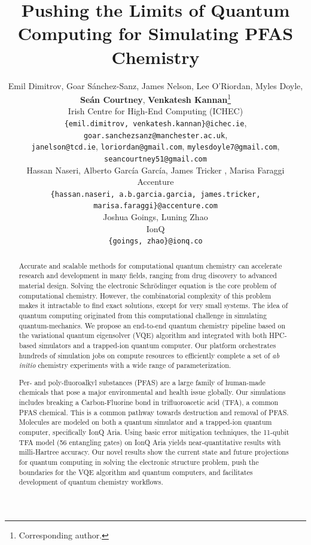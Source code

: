\documentclass[journal,onecolumn]{IEEEtran}
\title{
Pushing the Limits of Quantum Computing for Simulating PFAS Chemistry
}
\author{
    Emil Dimitrov, Goar S{\'a}nchez-Sanz, James Nelson, Lee O'Riordan, Myles Doyle, \\
    \textbf{Se{\'a}n Courtney}, \textbf{Venkatesh Kannan}{\thanks{Corresponding author.}} \\
    Irish Centre for High-End Computing (ICHEC) \\
    \texttt{\{emil.dimitrov, venkatesh.kannan\}@ichec.ie}, \texttt{goar.sanchezsanz@manchester.ac.uk}, \\
    \texttt{janelson@tcd.ie}, \texttt{loriordan@gmail.com}, \texttt{mylesdoyle7@gmail.com}, \texttt{seancourtney51@gmail.com} \\
  \And
    Hassan Naseri, Alberto Garc{\'i}a Garc{\'i}a, James Tricker , Marisa Faraggi\\
    Accenture \\
    \texttt{\{hassan.naseri, a.b.garcia.garcia, james.tricker, marisa.faraggi\}@accenture.com} \\
  \And
    Joshua Goings, Luning Zhao \\
    IonQ \\
    \texttt{\{goings, zhao\}@ionq.co}
}
\begin{document}
\maketitle

\begin{abstract}
Accurate and scalable methods for computational quantum chemistry can accelerate research and development in many fields, ranging from drug discovery to advanced material design. 
%
Solving the electronic Schr\"odinger equation is the core problem of computational chemistry. 
%
However, the combinatorial complexity of this problem makes it  intractable to find exact solutions, except for very small systems. 
%
The idea of quantum computing originated from this computational challenge in simulating quantum-mechanics. 
%
We propose an end-to-end quantum chemistry pipeline based on the variational quantum eigensolver (VQE) algorithm and integrated with both HPC-based simulators and a trapped-ion quantum computer. 
%
 Our platform orchestrates hundreds of simulation jobs on compute resources to efficiently complete a set of \emph{ab initio} chemistry experiments with a wide range of parameterization. 
%

Per- and poly-fluoroalkyl substances (PFAS) are a large family of human-made chemicals that pose a major environmental and health issue globally.
Our simulations includes breaking a Carbon-Fluorine bond in trifluoroacetic acid (TFA), a common PFAS chemical.
This is a common pathway towards destruction and removal of PFAS.
%
Molecules are modeled on both a quantum simulator and a trapped-ion quantum computer, specifically IonQ Aria. 
%
Using basic error mitigation techniques, the 11-qubit TFA model (56 entangling gates) on IonQ Aria yields near-quantitative results with milli-Hartree accuracy.
%
Our novel results show the current state and future projections for quantum computing in solving the electronic structure problem, push the boundaries for the VQE algorithm and quantum computers, and facilitates development of quantum chemistry workflows.  
%
\end{abstract}
\end{document}
